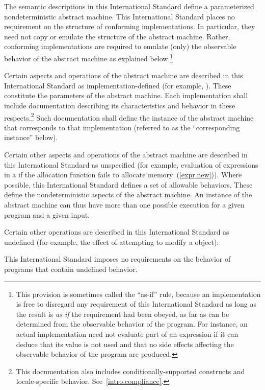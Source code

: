 \pnum
{}%
%
The semantic descriptions in this International Standard define a
parameterized nondeterministic abstract machine. This International
Standard places no requirement on the structure of conforming
implementations. In particular, they need not copy or emulate the
structure of the abstract machine.
%
%
Rather, conforming implementations are required to emulate (only) the observable
behavior of the abstract machine as explained below.\footnote{This provision is
sometimes called the ``as-if'' rule, because an implementation is free to
disregard any requirement of this International Standard as long as the result
is \emph{as if} the requirement had been obeyed, as far as can be determined
from the observable behavior of the program. For instance, an actual
implementation need not evaluate part of an expression if it can deduce that its
value is not used and that no
%
side effects affecting the
observable behavior of the program are produced.}

%
\pnum
Certain aspects and operations of the abstract machine are described in this
International Standard as implementation-defined (for example,
). These constitute the parameters of the abstract machine.
Each implementation shall include documentation describing its characteristics
and behavior in these respects.\footnote{This documentation also includes
conditionally-supported constructs and locale-specific behavior.
See~\ref{intro.compliance}.} Such documentation shall define the instance of the
abstract machine that corresponds to that implementation (referred to as the
``corresponding instance'' below).

%
\pnum
Certain other aspects and operations of the abstract machine are
described in this International Standard as unspecified (for example,
evaluation of expressions in a  if the allocation
function fails to allocate memory~(\ref{expr.new})). Where possible, this
International Standard defines a set of allowable behaviors. These
define the nondeterministic aspects of the abstract machine. An instance
of the abstract machine can thus have more than one possible execution
for a given program and a given input.

%
\pnum
Certain other operations are described in this International Standard as
undefined (for example, the effect of
attempting to modify a  object).
\begin{note} This International Standard imposes no requirements on the
behavior of programs that contain undefined behavior. \end{note}

